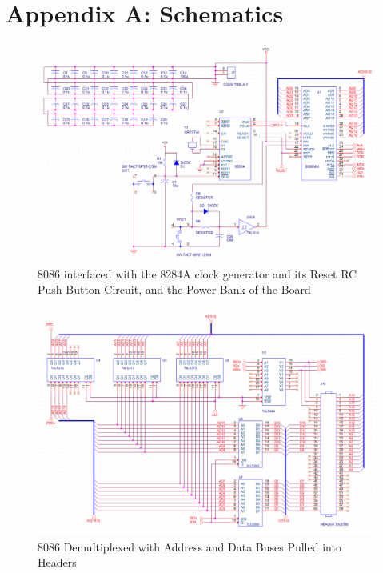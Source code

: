 \newpage

\appendix {}

    \section{Appendix A: Schematics} \label{appendix:schematics}

        \begin{figure}[ht]
            \begin{center}
                \includegraphics[width=1\textwidth]{figures/schematics/8086.png}
                \caption{8086 interfaced with the 8284A clock generator and its Reset RC Push Button Circuit, and the Power Bank of the Board} \label{fig:page1}
            \end{center}
        \end{figure}

        \begin{figure}[ht]
            \begin{center}
                \includegraphics[width=1\textwidth]{figures/schematics/buffers.png}
                \caption{8086 Demultiplexed with Address and Data Buses Pulled into Headers} \label{fig:page2}
            \end{center}
        \end{figure}

